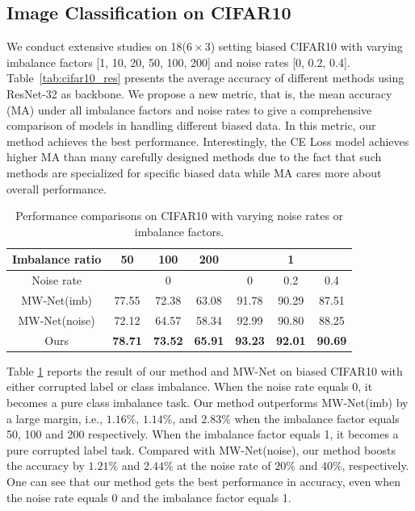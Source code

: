 \documentclass[letterpaper]{article} %
\begin{document}
\subsection{Image Classification on CIFAR10} \label{sec:vis_cifar10}

We conduct extensive studies on 18($6 \times 3$) setting biased CIFAR10 with varying imbalance factors [1, 10, 20, 50, 100, 200] and noise rates [0, 0.2, 0.4].
Table~\ref{tab:cifar10_res} presents the average accuracy of different methods using ResNet-32 as backbone.
We propose a new metric, that is, the mean accuracy (MA) under all imbalance factors and noise rates to give a comprehensive comparison of models in handling different biased data.
In this metric, our method achieves the best performance.
Interestingly, the CE Loss model achieves higher MA than many carefully designed methods due to the fact that such methods are specialized for specific biased data while MA cares more about overall performance.

\begin{table}[t]
\begin{center}
\begin{adjustbox}{max width=0.47\textwidth}
\begin{tabular}{c|c|c|c|c|c|c}
\hline
Imbalance ratio & 50    & 100   & 200   & \multicolumn{3}{c}{1} \\
\hline
Noise rate & \multicolumn{3}{c|}{0} & 0     & 0.2   & 0.4 \\
\hline
MW-Net(imb) & 77.55 & 72.38 & 63.08 & 91.78 & 90.29 & 87.51 \\
MW-Net(noise) & 72.12  & 64.57  & 58.34  & 92.99  & 90.80  & 88.25  \\
Ours  & \textbf{78.71} & \textbf{73.52} & \textbf{65.91} & \textbf{93.23} & \textbf{92.01} & \textbf{90.69} \\
\hline
\end{tabular}%
\end{adjustbox}
\caption{Performance comparisons on CIFAR10 with varying noise rates or imbalance factors.
}
\label{tab:cifar10_res_d}
\end{center}
\end{table}

Table \ref{tab:cifar10_res_d} reports the result of our method and MW-Net on biased CIFAR10 with either corrupted label or class imbalance.
When the noise rate equals 0, it becomes a pure class imbalance task.
Our method outperforms MW-Net(imb) by a large margin, i.e., $1.16\%$, $1.14\%$, and $2.83\%$ when the imbalance factor equals 50, 100 and 200 respectively.
When the imbalance factor equals 1, it becomes a pure corrupted label task.
Compared with MW-Net(noise), our method boosts the accuracy by $1.21\%$ and $2.44\%$ at the noise rate of $20\%$ and $40\%$, respectively.
One can see that our method gets the best performance in accuracy, even when the noise rate equals 0 and the imbalance factor equals 1.
\end{document}
